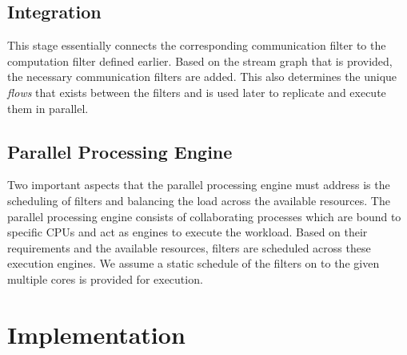 \documentclass[10pt, conference, compsocconf, reqno]{IEEEtran}
\newcommand{\comment}[1]{}
\begin{document}
\subsection{Integration}

\comment{The sequence of tasks that can be executed in parallel is determined at this stage. The integration stage is used to combine the application graph and the packet processing graph into a larger graph that unifies and represents the overall operations. The dependency relations identified earlier are used in establishing links between the graphs. We determine the sequence of tasks that can be executed in parallel from both the application task graph and packet processing graph. The combined set of tasks is then used by the parallel processing engine.}

This stage essentially connects the corresponding communication filter to the computation filter defined earlier. Based on the stream graph that is provided, the necessary communication filters are added. This also determines the unique \textit{flows} that exists between the filters and is used later to replicate and execute them in parallel.

\subsection{Parallel Processing Engine}

Two important aspects that the parallel processing engine must address is the scheduling of filters and balancing the load across the available resources. The parallel processing engine consists of collaborating processes which are bound to specific CPUs and act as engines to execute the workload. Based on their requirements and the available resources, filters are scheduled across these execution engines. We assume a static schedule of the filters on to the given multiple cores is provided for execution. \comment{In this manner, the workload can be distributed flexibly.}

\section{Implementation}
\label{imple}
\end{document}
